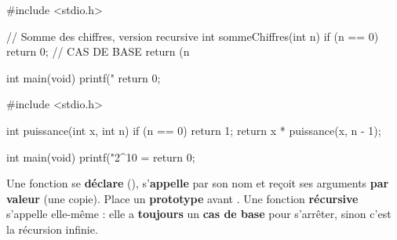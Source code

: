 \begin{codec}
#include <stdio.h>

// Somme des chiffres, version recursive
int sommeChiffres(int n) {
    if (n == 0) {
        return 0;                  // CAS DE BASE
    }
    return (n %
}

int main(void) {
    printf("%
    return 0;
}
\end{codec}

\begin{codec}
#include <stdio.h>

int puissance(int x, int n) {
    if (n == 0) {
        return 1;
    }
    return x * puissance(x, n - 1);
}

int main(void) {
    printf("2^10 = %
    return 0;
}
\end{codec}

\begin{aretenir}
Une fonction se \textbf{déclare} (),
s'\textbf{appelle} par son nom et reçoit ses arguments \textbf{par valeur} (une
copie). Place un \textbf{prototype} avant . Une fonction
\textbf{récursive} s'appelle elle-même : elle a \textbf{toujours} un \textbf{cas
de base} pour s'arrêter, sinon c'est la récursion infinie.
\end{aretenir}
